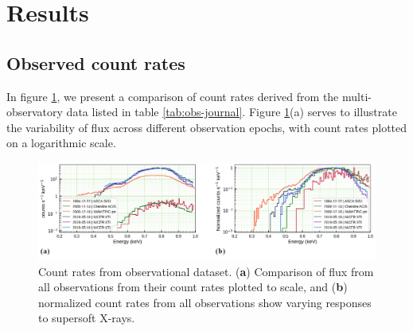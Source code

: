 \section{Results}

    \subsection{Observed count rates}
    In figure \ref{fig:all-counts}, we present a comparison of count rates derived from the multi-observatory data listed in table \ref{tab:obs-journal}. Figure \ref{fig:all-counts}(a) serves to illustrate the variability of flux across different observation epochs, with count rates plotted on a logarithmic scale. %
    
    \begin{figure}[!htb]
        \centering
        \includegraphics[width=\textwidth]{figures/ldata/mr-vel-rates_all-obs}
        \caption{Count rates from observational dataset. (\textbf{a}) Comparison of flux from all observations from their count rates plotted to scale, and (\textbf{b}) normalized count rates from all observations show varying responses to supersoft X-rays.}
        \label{fig:all-counts}
    \end{figure}

    
